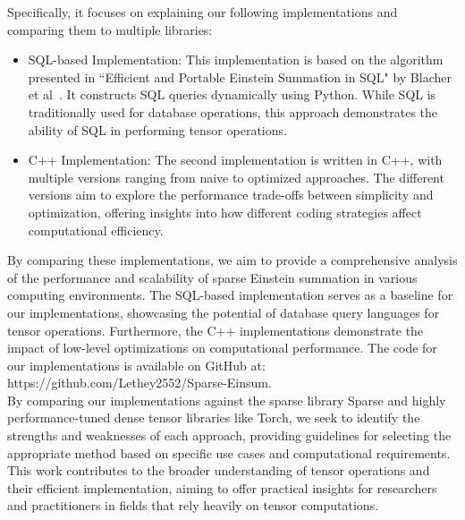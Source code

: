 Specifically, it focuses on explaining our following implementations and comparing them
to multiple libraries:
%
\begin{itemize}
      \item SQL-based Implementation:
            This implementation is based on the algorithm presented in ``Efficient and
            Portable Einstein Summation in SQL" by Blacher et al~\cite{sql_einsum}.
            It constructs SQL queries dynamically using Python. While SQL is
            traditionally used for database operations, this approach demonstrates
            the ability of SQL in performing tensor operations.
      \item C++ Implementation: The second implementation is written in C++, with multiple
            versions ranging from naive to optimized approaches. The different versions
            aim to explore the performance trade-offs between simplicity and optimization,
            offering insights into how different coding strategies affect computational
            efficiency.
\end{itemize}
%
%
By comparing these implementations, we aim to provide a comprehensive analysis of
the performance and scalability of sparse Einstein summation in various computing 
environments. The SQL-based implementation serves as a baseline for our implementations,
showcasing the potential of database query languages for tensor operations.
Furthermore, the C++ implementations demonstrate the impact of low-level optimizations
on computational performance. The code for our implementations is available on
GitHub at: https://github.com/Lethey2552/Sparse-Einsum.
\\
By comparing our implementations against the sparse library Sparse and highly
performance-tuned dense tensor libraries like Torch, we seek to identify the
strengths and weaknesses of each approach, providing guidelines for selecting the
appropriate method based on specific use cases and computational requirements.
This work contributes to the broader understanding of tensor operations and their
efficient implementation, aiming to offer practical insights for researchers and
practitioners in fields that rely heavily on tensor computations.